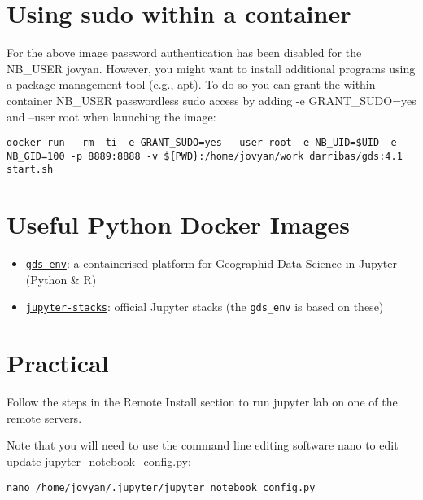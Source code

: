 \documentclass[
]{book}
\providecommand{\tightlist}{%
  \setlength{\itemsep}{0pt}\setlength{\parskip}{0pt}}
\begin{document}
\hypertarget{using-sudo-within-a-container}{%
\section{Using sudo within a container}\label{using-sudo-within-a-container}}

For the above image password authentication has been disabled for the NB\_USER jovyan. However, you might want to install additional programs using a package management tool (e.g., apt). To do so you can grant the within-container NB\_USER passwordless sudo access by adding -e GRANT\_SUDO=yes and --user root when launching the image:

\begin{verbatim}
docker run --rm -ti -e GRANT_SUDO=yes --user root -e NB_UID=$UID -e NB_GID=100 -p 8889:8888 -v ${PWD}:/home/jovyan/work darribas/gds:4.1 start.sh  
\end{verbatim}

\hypertarget{useful-python-docker-images}{%
\section{Useful Python Docker Images}\label{useful-python-docker-images}}

\begin{itemize}
\tightlist
\item
  \href{https://github.com/darribas/gds_env}{\texttt{gds\_env}}: a containerised platform
  for Geographid Data Science in Jupyter (Python \& R)
\item
  \href{https://github.com/jupyter/docker-stacks}{\texttt{jupyter-stacks}}: official
  Jupyter stacks (the \texttt{gds\_env} is based on these)
\end{itemize}

\hypertarget{practical-2}{%
\section{Practical}\label{practical-2}}

Follow the steps in the Remote Install section to run jupyter lab on one of the remote servers.

Note that you will need to use the command line editing software nano to edit update jupyter\_notebook\_config.py:

\begin{verbatim}
nano /home/jovyan/.jupyter/jupyter_notebook_config.py
\end{verbatim}
\end{document}
